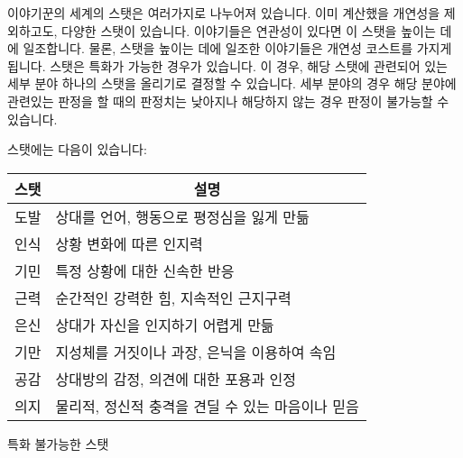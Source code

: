 \documentclass{report}
\begin{document}
	이야기꾼의 세계의 스탯은 여러가지로 나누어져 있습니다. 이미 계산했을 개연성을 제외하고도, 다양한 스탯이 있습니다. 이야기들은 연관성이 있다면 이 스탯을 높이는 데에 일조합니다. 물론, 스탯을 높이는 데에 일조한 이야기들은 개연성 코스트를 가지게 됩니다.
	스탯은 특화가 가능한 경우가 있습니다. 이 경우, 해당 스탯에 관련되어 있는 세부 분야 하나의 스탯을 올리기로 결정할 수 있습니다. 세부 분야의 경우 해당 분야에 관련있는 판정을 할 때의 판정치는 낮아지나 해당하지 않는 경우 판정이 불가능할 수 있습니다.
	
	스탯에는 다음이 있습니다:
	
	\smallskip
	
	\begin{minipage}{\textwidth}
		\begin{tabularx}{\textwidth}{c|X}
			\hline
			\textbf{스탯} & \multicolumn{1}{c|}{\textbf{설명}}\\ \hline \hline
			도발          & 상대를 언어, 행동으로 평정심을 잃게 만듦\\\hline
			인식          & 상황 변화에 따른 인지력          \\\hline
			기민          & 특정 상황에 대한 신속한 반응       \\\hline
			근력          & 순간적인 강력한 힘, 지속적인 근지구력  \\\hline
			은신          & 상대가 자신을 인지하기 어렵게 만듦    \\\hline
			기만          & 지성체를 거짓이나 과장, 은닉을 이용하여 속임 \\\hline
			공감          & 상대방의 감정, 의견에 대한 포용과 인정 \\\hline
			의지          & 물리적, 정신적 충격을 견딜 수 있는 마음이나 믿음\\\hline
		\end{tabularx}
		
		\smallskip
		
		\begin{tightcenter}
			특화 불가능한 스탯
		\end{tightcenter}
	
	\medskip
	

\end{minipage}
\end{document}
